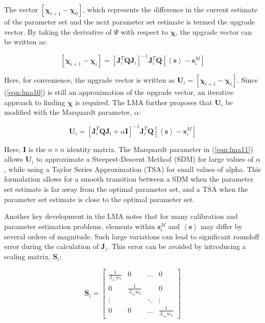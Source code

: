 The vector $\left[ \boldsymbol{\chi}_{i+1}-\boldsymbol{\chi}_0 \right]$, which represents the difference in the current estimate of the parameter set and the next parameter set estimate is termed the upgrade vector. By taking the derivative of $\Psi$ with respect to $\boldsymbol{\chi}$, the upgrade vector can be written as:

\begin{equation}
\left[ \boldsymbol{\chi}_{i+1}-\boldsymbol{\chi}_i \right] = \left[\mathbf{J}_i^T\mathbf{Q}\mathbf{J}_i\right]^{-1}\mathbf{J}_i^T\mathbf{Q}\left[\left<\mathbf{s}\right>-\mathbf{s}^M_i\right]
\label{eqn:lma10}
\end{equation}

Here, for convenience, the upgrade vector is written as $\mathbf{U}_{i} = \left[ \boldsymbol{\chi}_{i+1}-\boldsymbol{\chi}_i \right]$. Since (\ref{eqn:lma10}) is still an approximation of the upgrade vector, an iterative approach to finding $\boldsymbol{\chi}$ is required. The LMA further proposes that $\boldsymbol{U}_i$ be modified with the Marquardt parameter, $\alpha$:


\begin{equation}
\mathbf{U}_{i} = \left[\mathbf{J}_i^T\mathbf{Q}\mathbf{J}_i+\alpha\mathbf{I}\right]^{-1}\mathbf{J}_i^T\mathbf{Q}\left[\left<\mathbf{s}\right>-\mathbf{s}^M_i\right]
\label{eqn:lma11}
\end{equation}

Here, $\mathbf{I}$ is the $n\times n$ identity matrix. The Marquardt parameter in (\ref{eqn:lma11}) allows $\mathbf{U}_{i}$ to approximate a Steepest-Descent Method (SDM) for large values of $\alpha$, while using a Taylor Series Approximation (TSA) for small values of alpha. This formulation allows for a smooth transition between a SDM when the parameter set estimate is far away from the optimal parameter set, and a TSA when the parameter set estimate is close to the optimal parameter set.

Another key development in the LMA notes that for many calibration and parameter estimation problems, elements within $\mathbf{s}^M_i$ and $\left<\mathbf{s}\right>$ may differ by several orders of magnitude. Such large variations can lead to significant roundoff error during the calculation of $\mathbf{J}_i$. This error can be avoided by introducing a scaling matrix, $\mathbf{S}_i$:

\begin{equation}
\mathbf{S}_i=\begin{bmatrix}
\frac{1}{J_{i_{11}}w_1} & 0    & \dots  & 0\\ 
0 & \frac{1}{J_{i_{22}}w_2} &        & 0\\ 
\vdots&       & \ddots & \vdots \\ 
0    & 0    & \dots  & \frac{1}{J_{i_{nn}}w_n}
\end{bmatrix}
\label{eqn:lma12}
\end{equation}

